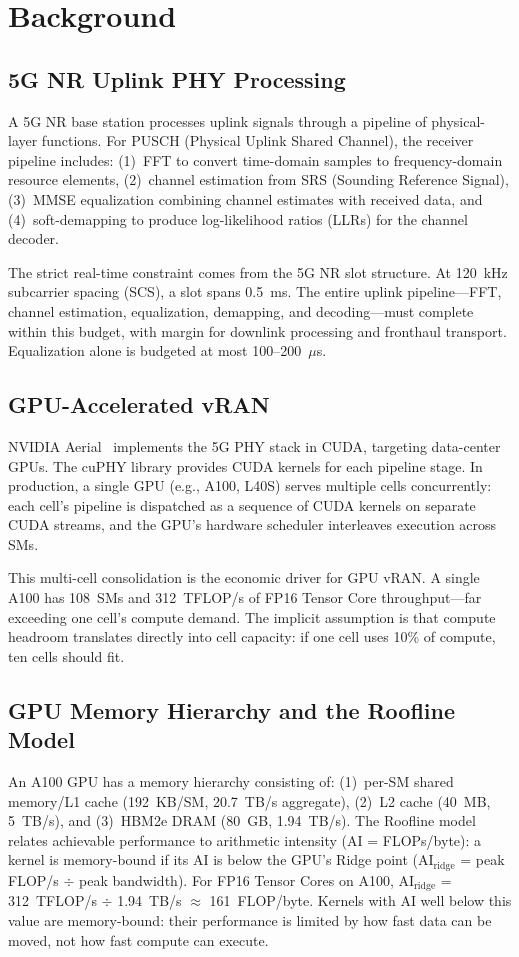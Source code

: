 \section{Background}
\label{sec:background}

\subsection{5G NR Uplink PHY Processing}

A 5G NR base station processes uplink signals through a pipeline of physical-layer functions. For PUSCH (Physical Uplink Shared Channel), the receiver pipeline includes: (1)~FFT to convert time-domain samples to frequency-domain resource elements, (2)~channel estimation from SRS (Sounding Reference Signal), (3)~MMSE equalization combining channel estimates with received data, and (4)~soft-demapping to produce log-likelihood ratios (LLRs) for the channel decoder.

The strict real-time constraint comes from the 5G NR slot structure. At 120~kHz subcarrier spacing (SCS), a slot spans 0.5~ms. The entire uplink pipeline---FFT, channel estimation, equalization, demapping, and decoding---must complete within this budget, with margin for downlink processing and fronthaul transport. Equalization alone is budgeted at most 100--200~$\mu$s.

\subsection{GPU-Accelerated vRAN}

NVIDIA Aerial~\cite{nvidia_aerial} implements the 5G PHY stack in CUDA, targeting data-center GPUs. The cuPHY library provides CUDA kernels for each pipeline stage. In production, a single GPU (e.g., A100, L40S) serves multiple cells concurrently: each cell's pipeline is dispatched as a sequence of CUDA kernels on separate CUDA streams, and the GPU's hardware scheduler interleaves execution across SMs.

This multi-cell consolidation is the economic driver for GPU vRAN. A single A100 has 108~SMs and 312~TFLOP/s of FP16 Tensor Core throughput---far exceeding one cell's compute demand. The implicit assumption is that compute headroom translates directly into cell capacity: if one cell uses 10\% of compute, ten cells should fit.

\subsection{GPU Memory Hierarchy and the Roofline Model}

An A100 GPU has a memory hierarchy consisting of: (1)~per-SM shared memory/L1 cache (192~KB/SM, 20.7~TB/s aggregate), (2)~L2 cache (40~MB, 5~TB/s), and (3)~HBM2e DRAM (80~GB, 1.94~TB/s). The Roofline model~\cite{roofline} relates achievable performance to arithmetic intensity (AI = FLOPs/byte): a kernel is memory-bound if its AI is below the GPU's Ridge point (AI$_{\text{ridge}}$ = peak FLOP/s $\div$ peak bandwidth). For FP16 Tensor Cores on A100, AI$_{\text{ridge}}$ = 312~TFLOP/s $\div$ 1.94~TB/s $\approx$ 161~FLOP/byte. Kernels with AI well below this value are memory-bound: their performance is limited by how fast data can be moved, not how fast compute can execute.
